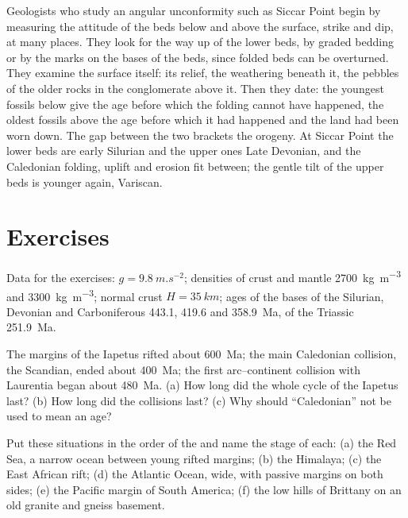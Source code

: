 \begin{inthefield}
Geologists who study an angular unconformity such as Siccar Point begin by measuring the
attitude of the beds below and above the surface, strike and dip, at many places. They look
for the way up of the lower beds, by graded bedding or by the marks on the bases of the beds,
since folded beds can be overturned. They examine the surface itself: its relief, the
weathering beneath it, the pebbles of the older rocks in the conglomerate above it. Then they
date: the youngest fossils below give the age before which the folding cannot have happened,
the oldest fossils above the age before which it had happened and the land had been worn
down. The gap between the two brackets the orogeny. At Siccar Point the lower beds are early
Silurian and the upper ones Late Devonian, and the Caledonian folding, uplift and erosion fit
between; the gentle tilt of the upper beds is younger again, Variscan.
\end{inthefield}

\section*{Exercises}\label{sec:b2:wilson-cycle:exercises}

Data for the exercises: $g = \qty{9.8}{m.s^{-2}}$; densities of crust and mantle
\qty{2700}{kg.m^{-3}} and \qty{3300}{kg.m^{-3}}; normal crust $H = \qty{35}{km}$; ages of the
bases of the Silurian, Devonian and Carboniferous 443.1, 419.6 and \qty{358.9}{Ma}, of the
Triassic \qty{251.9}{Ma}.

\begin{exercise}[$\star$]\label{exo:b2:wilson-cycle:1}
The margins of the Iapetus rifted about \qty{600}{Ma}; the main Caledonian collision, the
Scandian, ended about \qty{400}{Ma}; the first arc--continent collision with Laurentia began
about \qty{480}{Ma}. (a) How long did the whole cycle of the Iapetus last? (b) How long did the
collisions last? (c) Why should ``Caledonian'' not be used to mean an age?
\end{exercise}

\begin{exercise}[$\star$]\label{exo:b2:wilson-cycle:2}
Put these situations in the order of the  and name the stage of each: (a) the
Red Sea, a narrow ocean between young rifted margins; (b) the Himalaya; (c) the East African
rift; (d) the Atlantic Ocean, wide, with passive margins on both sides; (e) the Pacific margin
of South America; (f) the low hills of Brittany on an old granite and gneiss basement.
\end{exercise}

